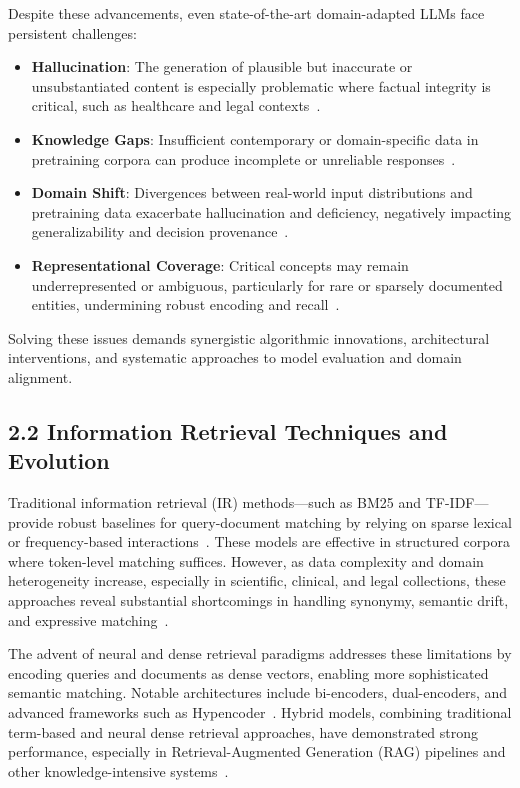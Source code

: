 \documentclass[11pt]{article}
\begin{document}
Despite these advancements, even state-of-the-art domain-adapted LLMs face persistent challenges:

\begin{itemize}
  \item \textbf{Hallucination}: The generation of plausible but inaccurate or unsubstantiated content is especially problematic where factual integrity is critical, such as healthcare and legal contexts~\cite{ref7,ref20,ref46,ref52,ref54,ref63,ref64}.
  \item \textbf{Knowledge Gaps}: Insufficient contemporary or domain-specific data in pretraining corpora can produce incomplete or unreliable responses~\cite{ref7,ref20,ref54,ref64}.
  \item \textbf{Domain Shift}: Divergences between real-world input distributions and pretraining data exacerbate hallucination and deficiency, negatively impacting generalizability and decision provenance~\cite{ref7,ref63,ref64}.
  \item \textbf{Representational Coverage}: Critical concepts may remain underrepresented or ambiguous, particularly for rare or sparsely documented entities, undermining robust encoding and recall~\cite{ref20,ref46,ref63}.
\end{itemize}

Solving these issues demands synergistic algorithmic innovations, architectural interventions, and systematic approaches to model evaluation and domain alignment.

\subsection{2.2 Information Retrieval Techniques and Evolution}

Traditional information retrieval (IR) methods—such as BM25 and TF-IDF—provide robust baselines for query-document matching by relying on sparse lexical or frequency-based interactions~\cite{ref42,ref44,ref52}. These models are effective in structured corpora where token-level matching suffices. However, as data complexity and domain heterogeneity increase, especially in scientific, clinical, and legal collections, these approaches reveal substantial shortcomings in handling synonymy, semantic drift, and expressive matching~\cite{ref43,ref44,ref52}.

The advent of neural and dense retrieval paradigms addresses these limitations by encoding queries and documents as dense vectors, enabling more sophisticated semantic matching. Notable architectures include bi-encoders, dual-encoders, and advanced frameworks such as Hypencoder~\cite{ref4,ref5,ref8,ref10,ref14,ref15,ref16,ref17,ref22,ref26,ref28,ref36,ref37,ref38,ref43,ref52,ref54,ref55}. Hybrid models, combining traditional term-based and neural dense retrieval approaches, have demonstrated strong performance, especially in Retrieval-Augmented Generation (RAG) pipelines and other knowledge-intensive systems~\cite{ref42,ref43,ref52,ref54}.
\end{document}
